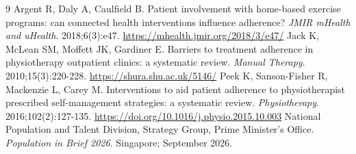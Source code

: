 \documentclass[11pt,a4paper]{article}
\begin{document}
\begin{thebibliography}{9}\small
{} Argent R, Daly A, Caulfield B. Patient involvement with home-based exercise programs: can connected health interventions influence adherence? \emph{JMIR mHealth and uHealth}. 2018;6(3):e47. \url{https://mhealth.jmir.org/2018/3/e47/}
 Jack K, McLean SM, Moffett JK, Gardiner E. Barriers to treatment adherence in physiotherapy outpatient clinics: a systematic review. \emph{Manual Therapy}. 2010;15(3):220-228. \url{https://shura.shu.ac.uk/5146/}
 Peek K, Sanson-Fisher R, Mackenzie L, Carey M. Interventions to aid patient adherence to physiotherapist prescribed self-management strategies: a systematic review. \emph{Physiotherapy}. 2016;102(2):127-135. \url{https://doi.org/10.1016/j.physio.2015.10.003}
 National Population and Talent Division, Strategy Group, Prime Minister's Office. \emph{Population in Brief 2026}. Singapore; September 2026.
\end{thebibliography}
\end{document}
